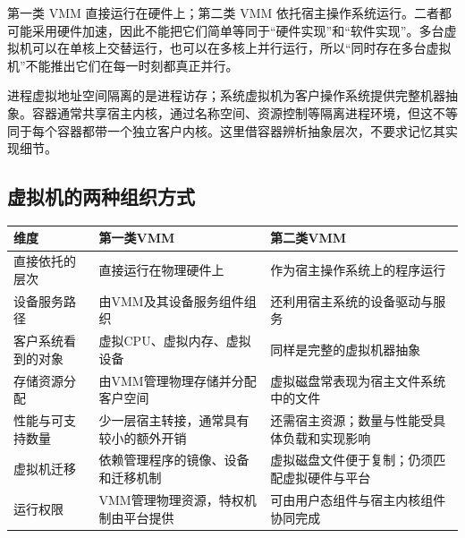 第一类 VMM 直接运行在硬件上；第二类 VMM 依托宿主操作系统运行。二者都可能采用硬件加速，因此不能把它们简单等同于``硬件实现''和``软件实现''。多台虚拟机可以在单核上交替运行，也可以在多核上并行运行，所以``同时存在多台虚拟机''不能推出它们在每一时刻都真正并行。

进程虚拟地址空间隔离的是进程访存；系统虚拟机为客户操作系统提供完整机器抽象。容器通常共享宿主内核，通过名称空间、资源控制等隔离进程环境，但这不等同于每个容器都带一个独立客户内核。这里借容器辨析抽象层次，不要求记忆其实现细节。

\subsection{虚拟机的两种组织方式}\label{OS01-vmm-models}

\par\medskip\noindent\begin{minipage}{\linewidth}\fontsize{9.3}{12}\selectfont\begin{tabularx}{\linewidth}{@{}YYY@{}}
\toprule\noalign{}
\begin{minipage}[b]{\linewidth}\raggedright
维度
\end{minipage} & \begin{minipage}[b]{\linewidth}\raggedright
第一类VMM
\end{minipage} & \begin{minipage}[b]{\linewidth}\raggedright
第二类VMM
\end{minipage} \\
\midrule\noalign{}


直接依托的层次 & 直接运行在物理硬件上 & 作为宿主操作系统上的程序运行 \\
设备服务路径 & 由VMM及其设备服务组件组织 & 还利用宿主系统的设备驱动与服务 \\
客户系统看到的对象 & 虚拟CPU、虚拟内存、虚拟设备 & 同样是完整的虚拟机器抽象 \\
存储资源分配 & 由VMM管理物理存储并分配客户空间 & 虚拟磁盘常表现为宿主文件系统中的文件 \\
性能与可支持数量 & 少一层宿主转接，通常具有较小的额外开销 & 还需宿主资源；数量与性能受具体负载和实现影响 \\
虚拟机迁移 & 依赖管理程序的镜像、设备和迁移机制 & 虚拟磁盘文件便于复制；仍须匹配虚拟硬件与平台 \\
运行权限 & VMM管理物理资源，特权机制由平台提供 & 可由用户态组件与宿主内核组件协同完成 \\
\bottomrule\end{tabularx}
\end{minipage}\par\medskip

